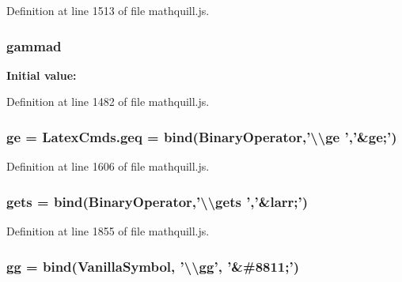Definition at line 1513 of file mathquill.\-js.

\subsubsection[{gammad}]{ gammad}\label{mathquill_8js_a934bfc4f8f4336af22a013053f3ad65c}
{\bfseries Initial value\-:}


Definition at line 1482 of file mathquill.\-js.

\subsubsection[{ge}]{ ge = Latex\-Cmds.\-geq = {\bf bind}({\bf Binary\-Operator},'\textbackslash{}\textbackslash{}ge ','\&ge;')}\label{mathquill_8js_a0815593c9422039ebb907da33a20d9bd}


Definition at line 1606 of file mathquill.\-js.

\subsubsection[{gets}]{ gets = {\bf bind}({\bf Binary\-Operator},'\textbackslash{}\textbackslash{}gets ','\&{\bf larr};')}\label{mathquill_8js_a5bbb3fb6469322840b3f35b9b413ae9f}


Definition at line 1855 of file mathquill.\-js.

\subsubsection[{gg}]{ gg = {\bf bind}({\bf Vanilla\-Symbol}, '\textbackslash{}\textbackslash{}gg', '\&\#8811;')}\label{mathquill_8js_a4b37ef6a3ee9186fe2e7539039c49c3e}


